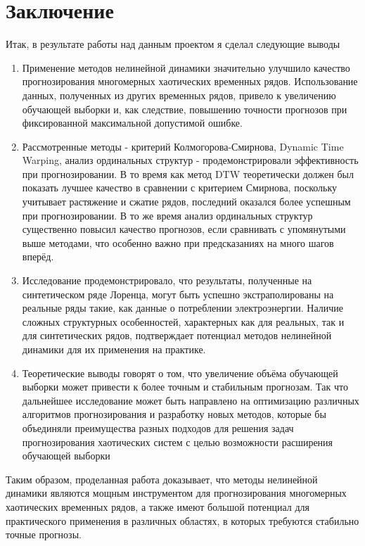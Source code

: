 \documentclass[a4paper, 12pt]{extarticle}
\begin{document}
\section{Заключение}

Итак, в результате работы над данным проектом я сделал следующие выводы

\begin{enumerate}
    \item Применение методов нелинейной динамики значительно улучшило качество прогнозирования многомерных хаотических временных рядов. Использование данных, полученных из других временных рядов, привело к увеличению обучающей выборки и, как следствие, повышению точности прогнозов при фиксированной максимальной допустимой ошибке.
    
    \item Рассмотренные методы - критерий Колмогорова-Смирнова, Dynamic Time Warping, анализ ординальных структур - продемонстрировали эффективность при прогнозировании. В то время как метод DTW теоретически должен был показать лучшее качество в сравнении с критерием Смирнова, поскольку учитывает растяжение и сжатие рядов, последний оказался более успешным при прогнозировании. В то же время анализ ординальных структур существенно повысил качество прогнозов, если сравнивать с упомянутыми выше методами, что особенно важно при предсказаниях на много шагов вперёд.
    
    \item Исследование продемонстрировало, что результаты, полученные на синтетическом ряде Лоренца, могут быть успешно экстраполированы на реальные ряды такие, как данные о потреблении электроэнергии. Наличие сложных структурных особенностей, характерных как для реальных, так и для синтетических рядов, подтверждает потенциал методов нелинейной динамики для их применения на практике.
    
    \item Теоретические выводы говорят о том, что увеличение объёма обучающей выборки может привести к более точным и стабильным прогнозам. Так что дальнейшее исследование может быть направлено на оптимизацию различных алгоритмов прогнозирования и разработку новых методов, которые бы объединяли преимущества разных подходов для решения задач прогнозирования хаотических систем с целью возможности расширения обучающей выборки
\end{enumerate}

Таким образом, проделанная работа доказывает, что методы нелинейной динамики являются мощным инструментом для прогнозирования многомерных хаотических временных рядов, а также имеют большой потенциал для практического применения в различных областях, в которых требуются стабильно точные прогнозы.

\newpage


\end{document}

